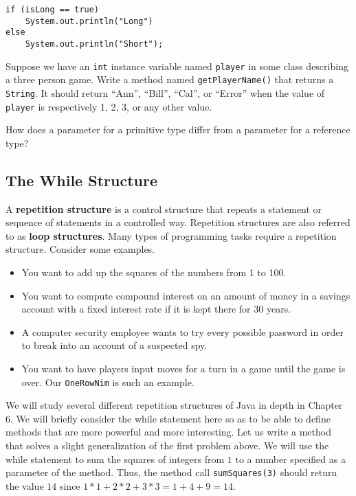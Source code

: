 \begin{SSTUDY}
\begin{jjjlisting}
\begin{lstlisting}
if (isLong == true)
    System.out.println("Long")
else
    System.out.println("Short");
\end{lstlisting}
\end{jjjlisting}

\item  Suppose we have an {\tt  int} instance variable named {\tt player}
in some class describing a three person game.  Write a method named
{\tt getPlayerName()} that returns a {\tt String}.  It should return
``Ann'', ``Bill'', ``Cal'', or ``Error'' when the value of {\tt
player} is respectively 1, 2, 3, or any other value.

\item  How does a parameter for a primitive type differ from a parameter
for a reference type?

\end{SSTUDY}

\subsection{The While Structure}

\noindent A {\bf repetition structure} 
is a control structure that repeats a statement or sequence of
statements in a controlled way.  Repetition structures are also
referred to as {\bf loop structures}.  Many types of programming tasks
require a repetition structure.  Consider some examples.

\begin{itemize}

\item You want to add up the squares of the numbers from 1 to 100.

\item You want to compute compound interest on an amount of money in a
savings account with a fixed interest rate if it is kept there for $30$ years.

\item A computer security employee wants to try every possible password in
order to break into an account of a suspected spy.

\item You want to have players input moves for a turn in a game until
the game is over. Our {\tt OneRowNim} is such an example.

\end{itemize}

We will study several different repetition structures of Java in depth in Chapter
6.
We will briefly consider the  while statement here so as to be able to
define methods that are more powerful and more interesting.
Let us write a method that solves a slight generalization
of the first problem above.  We will use the while statement to sum the
squares of integers from $1$ to a number specified as a parameter of the
method.  Thus, the method call {\tt sumSquares(3)} should return the value
$14$ since $1*1 + 2*2 + 3*3 = 1 + 4 + 9 = 14$.


